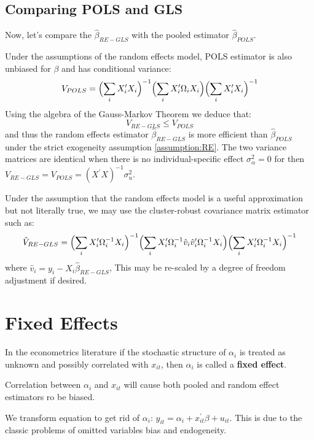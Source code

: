 \subsection{Comparing POLS and GLS}

Now, let's compare the $\hat{\beta}_{RE-GLS}$ with the pooled estimator $\hat{\beta}_{POLS}$.

Under the assumptions of the random effects model, POLS estimator is also unbiased for $\beta$ and has conditional variance:
\begin{gather*}
    V_{POLS} = \Bigl(\sum_{i} X_i^{\prime} X_i \Bigr)^{-1} \Bigl( \sum_{i}  X_i^{\prime} \Omega_i X_i \Bigr) \Bigl( \sum_{i}  X_i^{\prime} X_i \Bigr)^{-1} 
\end{gather*}
Using the algebra of the Gauss-Markov Theorem we deduce that:
\[V_{RE-GLS} \leq V_{POLS} \]
and thus the random effects estimator $\hat{\beta}_{RE-GLS}$ is more efficient than $\hat{\beta}_{POLS} $ under the strict exogeneity assumption \ref{assumption:RE}.
The two variance matrices are identical when there is no individual-specific effect $\sigma_{\alpha}^2 = 0$ for then $V_{RE-GLS} = V_{POLS} = \left(X^{\prime} X\right)^{-1} \sigma_u^2.$

Under the assumption that the random effects model is a useful approximation but not literally true, 
we may use the cluster-robust covariance matrix estimator such as:
\begin{gather*}
    \hat{V}_{RE-GLS} = \Bigl(\sum_{i} X_i^{\prime} \Omega_i^{-1} X_i\Bigr)^{-1} \Bigl( \sum_{i} X_i^{\prime} \Omega_i^{-1} \hat{v}_i \hat{v}_i^{\prime} \Omega_i^{-1} X_i \Bigr) \Bigl( \sum_{i} X_i^{\prime} \Omega_i^{-1} X_i \Bigr)^{-1} 
\end{gather*}
where $\hat{v}_i = y_i - X_i \hat{\beta}_{RE-GLS}$, This may be re-scaled by a degree of freedom adjustment if desired.

\section{Fixed Effects}
In the econometrics literature if the stochastic structure of $\alpha_i$ is treated as unknown
and possibly correlated with $x_{it}$, then $\alpha_i$ is called a \textbf{fixed effect}.

Correlation between $\alpha_i$ and $x_{it}$ will cause both pooled and random effect estimators ro be biased.

We transform equation to get rid of $\alpha_i$: $y_{it} = \alpha_i + x_{it}^{\prime} \beta + u_{it}.$
This is due to the classic problems of omitted variables bias and endogeneity. 

